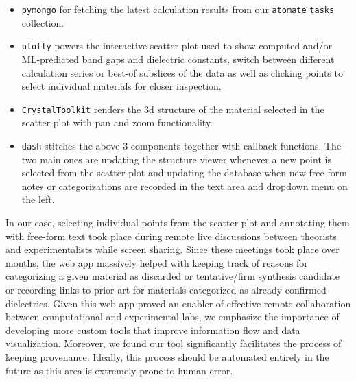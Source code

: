 \documentclass{article}
\begin{document}
\begin{itemize}
    \item \texttt{pymongo} \cite{fedorova_writes_2022} for fetching the latest calculation results from our \texttt{atomate} \texttt{tasks} collection.
    \item \texttt{plotly} powers the interactive scatter plot used to show computed and/or ML-predicted band gaps and dielectric constants, switch between different calculation series or best-of subslices of the data as well as clicking points to select individual materials for closer inspection.
    \item \texttt{CrystalToolkit} \cite{horton_crystal_2023} renders the 3d structure of the material selected in the scatter plot with pan and zoom functionality.
    \item \texttt{dash} \cite{hossain_visualization_2019} stitches the above 3 components together with callback functions. The two main ones are updating the structure viewer whenever a new point is selected from the scatter plot and updating the database when new free-form notes or categorizations are recorded in the text area and dropdown menu on the left.
\end{itemize}

In our case, selecting individual points from the scatter plot and annotating them with free-form text took place during remote live discussions between theorists and experimentalists while screen sharing. Since these meetings took place over months, the web app massively helped with keeping track of reasons for categorizing a given material as discarded or tentative/firm synthesis candidate or recording links to prior art for materials categorized as already confirmed dielectrics.
Given this web app proved an enabler of effective remote collaboration between computational and experimental labs, we emphasize the importance of developing more custom tools that improve information flow and data visualization. Moreover, we found our tool significantly facilitates the process of keeping provenance. Ideally, this process should be automated entirely in the future as this area is extremely prone to human error.
\end{document}
